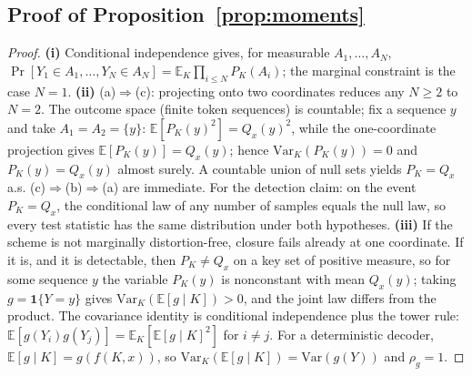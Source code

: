 \documentclass{article} %
\begin{document}
\subsection{Proof of Proposition~\ref{prop:moments}}
\begin{proof}
\textbf{(i)} Conditional independence gives, for measurable
$A_1,\dots,A_N$,
$\Pr[Y_1\in A_1,\dots,Y_N\in A_N]=\mathbb E_K\prod_{i\le N}P_K(A_i)$;
the marginal constraint is the case $N{=}1$.
\textbf{(ii)} (a)$\Rightarrow$(c): projecting onto two coordinates reduces
any $N\ge2$ to $N{=}2$. The outcome space (finite token sequences) is
countable; fix a sequence $y$ and take $A_1=A_2=\{y\}$:
$\mathbb E[P_K(y)^2]=Q_x(y)^2$, while the one-coordinate projection gives
$\mathbb E[P_K(y)]=Q_x(y)$; hence $\mathrm{Var}_K(P_K(y))=0$ and
$P_K(y)=Q_x(y)$ almost surely. A countable union of null sets yields
$P_K=Q_x$ a.s. (c)$\Rightarrow$(b)$\Rightarrow$(a) are immediate. For the
detection claim: on the event $P_K=Q_x$, the conditional law of any number
of samples equals the null law, so every test statistic has the same
distribution under both hypotheses.
\textbf{(iii)} If the scheme is not marginally distortion-free, closure
fails already at one coordinate. If it is, and it is detectable, then
$P_K\ne Q_x$ on a key set of positive measure, so for some sequence $y$ the
variable $P_K(y)$ is nonconstant with mean $Q_x(y)$; taking
$g=\mathbf 1\{Y=y\}$ gives $\mathrm{Var}_K(\mathbb E[g\mid K])>0$, and
the joint law differs from the product. The covariance identity is
conditional independence plus the tower rule:
$\mathbb E[g(Y_i)g(Y_j)]=\mathbb E_K[\mathbb E[g\mid K]^2]$ for
$i\ne j$. For a deterministic decoder, $\mathbb E[g\mid K]=g(f(K,x))$, so
$\mathrm{Var}_K(\mathbb E[g\mid K])=\mathrm{Var}(g(Y))$ and $\rho_g=1$.
\end{proof}
\end{document}
